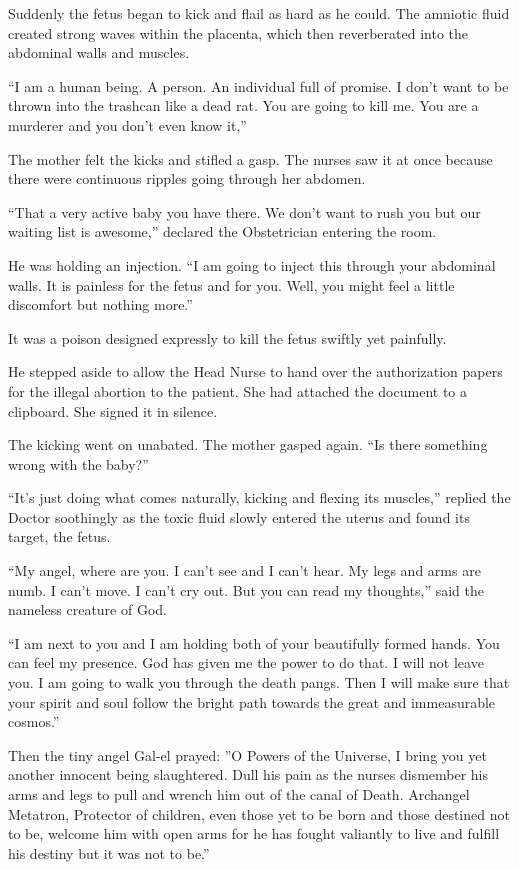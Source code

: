 Suddenly the fetus began to kick and flail as hard as he could. The amniotic fluid created strong waves within the placenta, which then reverberated into the abdominal walls and muscles.

``I am a human being. A person. An individual full of promise. I don't want to be thrown into the trashcan like a dead rat. You are going to kill me. You are a murderer and you don't even know it,''

The mother felt the kicks and stifled a gasp. The nurses saw it at once because there were continuous ripples going through her abdomen.

``That a very active baby you have there. We don't want to rush you but our waiting list is awesome,'' declared the Obstetrician entering the room.

He was holding an injection. ``I am going to inject this through your abdominal walls. It is painless for the fetus and for you. Well, you might feel a little discomfort but nothing more.''

It was a poison designed expressly to kill the fetus swiftly yet painfully.

He stepped aside to allow the Head Nurse to hand over the authorization papers for the illegal abortion to the patient. She had attached the document to a clipboard. She signed it in silence.

The kicking went on unabated. The mother gasped again. ``Is there something wrong with the baby?''

``It's just doing what comes naturally, kicking and flexing its muscles,'' replied the Doctor soothingly as the toxic fluid slowly entered the uterus and found its target, the fetus.

``My angel, where are you. I can't see and I can't hear. My legs and arms are numb. I can't move. I can't cry out. But you can read my thoughts,'' said the nameless creature of God.

``I am next to you and I am holding both of your beautifully formed hands. You can feel my presence. God has given me the power to do that. I will not leave you. I am going to walk you through the death pangs. Then I will make sure that your spirit and soul follow the bright path towards the great and immeasurable cosmos.''

Then the tiny angel Gal-el prayed: ''O Powers of the Universe, I bring you yet another innocent being slaughtered. Dull his pain as the nurses dismember his arms and legs to pull and wrench him out of the canal of Death. Archangel Metatron, Protector of children, even those yet to be born and those destined not to be, welcome him with open arms for he has fought valiantly to live and fulfill his destiny but it was not to be.''

